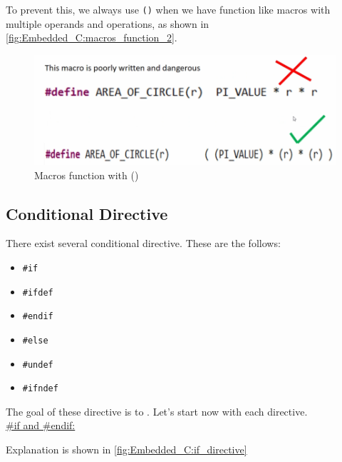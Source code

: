 To prevent this, we always use \verb|()| when we have function like macros with multiple operands and operations, as shown in \autoref{fig:Embedded_C:macros_function_2}.

\begin{figure}[h]
\centering
\includegraphics[scale=0.55]{Figures/Embedded_C/macros_function_2}
\caption{Macros function with ()}
\label{fig:Embedded_C:macros_function_2}
\end{figure}

\newpage
\subsection{Conditional Directive}

There exist several conditional directive. These are the follows:

\begin{itemize}
    \item \verb|#if|
    
    \item \verb|#ifdef|

    \item \verb|#endif| 

    \item \verb|#else|

    \item \verb|#undef|

    \item \verb|#ifndef|

\end{itemize}

The goal of these directive is to . Let's start now with each directive.\\

\underline{ \#if and \#endif:}

Explanation is shown in \autoref{fig:Embedded_C:if_directive}


